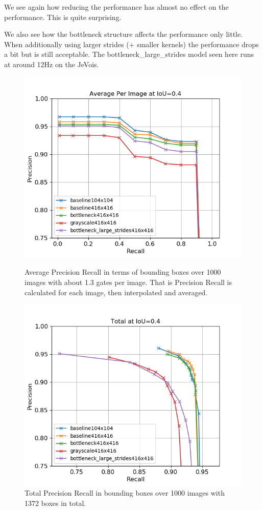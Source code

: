 \documentclass{article}
\begin{document}
We see again how reducing the performance has almost no effect on the performance. This is quite surprising.

We also see how the bottleneck structure affects the performance only little. When additionally using larger strides (+ smaller kernels) the performance drops a bit but is still acceptable. The bottleneck\_large\_strides model seen here runs at around 12Hz on the JeVois.

\begin{figure}[htbp]
		\centering
	\begin{minipage}{0.45\textwidth}
	\includegraphics[width=\linewidth]{pr04}
	\caption{Average Precision Recall in terms of bounding boxes over 1000 images with about 1.3 gates per image. That is Precision Recall is calculated for each image, then interpolated and averaged.}
	\end{minipage}
\hfill
\begin{minipage}{0.45\textwidth}
	\includegraphics[width=\linewidth]{totalpr04}
	\caption{Total Precision Recall in bounding boxes over 1000 images with 1372 boxes in total. }
\end{minipage}
\label{fig:pr}
\end{figure}
\end{document}
